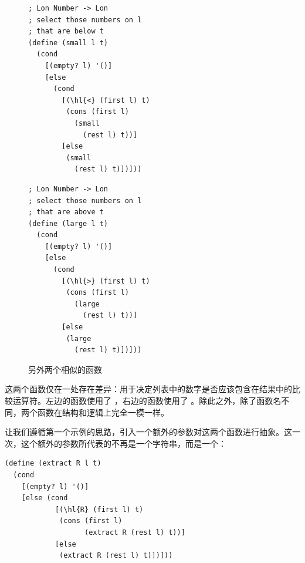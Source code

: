 \begin{figure}[htbp]
  \centering
  \begin{stepperbox}[unbreakable]
    \noindent\begin{minipage}[t]{0.48\linewidth}\vspace{0pt}
\begin{Verbatim}[commandchars=\\\{\}, fontsize=\fontsize{6.0pt}{7.2pt}\selectfont]
; Lon Number -> Lon
; select those numbers on l
; that are below t
(define (small l t)
  (cond
    [(empty? l) '()]
    [else
      (cond
        [(\hl{<} (first l) t)
         (cons (first l)
           (small
             (rest l) t))]
        [else
         (small
           (rest l) t)])]))
\end{Verbatim}
    \end{minipage}\hfill
    \begin{minipage}[t]{0.48\linewidth}\vspace{0pt}
\begin{Verbatim}[commandchars=\\\{\}, fontsize=\fontsize{6.0pt}{7.2pt}\selectfont]
; Lon Number -> Lon
; select those numbers on l
; that are above t
(define (large l t)
  (cond
    [(empty? l) '()]
    [else
      (cond
        [(\hl{>} (first l) t)
         (cons (first l)
           (large
             (rest l) t))]
        [else
         (large
           (rest l) t)])]))
\end{Verbatim}
    \end{minipage}
  \end{stepperbox}
  \caption{另外两个相似的函数}
  \label{fig:88}
\end{figure}

这两个函数仅在一处存在差异：用于决定列表中的数字是否应该包含在结果中的比较运算符。左边的函数使用了 \code{<}，右边的函数使用了 \code{>}。除此之外，除了函数名不同，两个函数在结构和逻辑上完全一模一样。

让我们遵循第一个示例的思路，引入一个额外的参数对这两个函数进行抽象。这一次，这个额外的参数所代表的不再是一个字符串，而是一个：

\begin{stepperbox}
\begin{Verbatim}[commandchars=\\\{\}, fontsize=\footnotesize]
(define (extract R l t)
  (cond
    [(empty? l) '()]
    [else (cond
            [(\hl{R} (first l) t)
             (cons (first l)
                   (extract R (rest l) t))]
            [else
             (extract R (rest l) t)])]))
\end{Verbatim}
\end{stepperbox}

